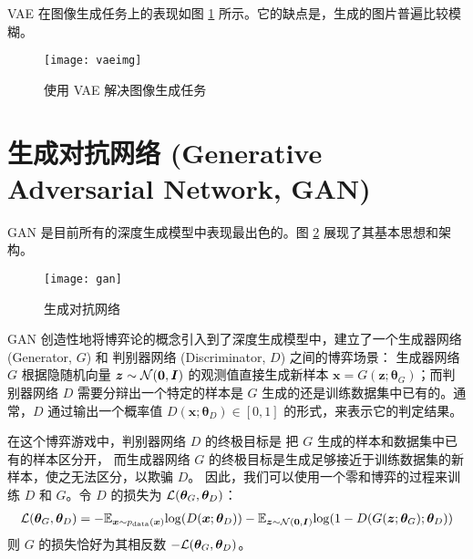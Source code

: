 VAE 在图像生成任务上的表现如图 \ref{fig:vaeimg} 所示。它的缺点是，生成的图片普遍比较模糊。
\begin{figure}[h]
	\centering%
	{\texttt{[image: vaeimg]}}
	\caption{使用 VAE 解决图像生成任务\cite{vae}}\label{fig:vaeimg}
\end{figure}







\section{生成对抗网络 (Generative Adversarial Network, GAN) \label{section:gan}}
GAN\cite{gan} 是目前所有的深度生成模型中表现最出色的。图 \ref{fig:gan} 展现了其基本思想和架构。


\begin{figure}[h]
	\centering%
	{\texttt{[image: gan]}}
	\caption{生成对抗网络}\label{fig:gan}
\end{figure}
GAN 创造性地将博弈论的概念引入到了深度生成模型中，建立了一个生成器网络 (Generator, $G$) 和 判别器网络 (Discriminator, $D$) 之间的博弈场景：
生成器网络 $G$ 根据隐随机向量 $\bm z \sim \mathcal{N}(\bm 0, \bm I)$ 的观测值直接生成新样本 $\bm x = G(\bm z; \bm\theta_G)$；而判别器网络 $D$ 需要分辩出一个特定的样本是 $G$ 生成的还是训练数据集中已有的。通常，$D$ 通过输出一个概率值 $D(\bm x; \bm\theta_D) \in [0, 1]$ 的形式，来表示它的判定结果。

在这个博弈游戏中，判别器网络 $D$ 的终极目标是
把 $G$ 生成的样本和数据集中已有的样本区分开，
而生成器网络 $G$ 的终极目标是生成足够接近于训练数据集的新样本，使之无法区分，以欺骗 $D$。
因此，我们可以使用一个零和博弈的过程来训练 $D$ 和 $G$。令 $D$ 的损失为 $\mathcal{L}(\bm\theta_G, \bm\theta_D)$：%
\begin{align}
	\mathcal{L}(\bm\theta_G, \bm\theta_D) =
	- \mathbb{E}_{\bm x \sim p_{\mathrm {data}}(\bm x)} {\log}(    D(\bm x; \bm\theta_D))
	- \mathbb{E}_{\bm z \sim \mathcal{N}(\bm 0, \bm I)} {\log}(1 - D( G(\bm z; \bm\theta_G); \bm\theta_D))
	\label{eq:ganloss}
\end{align}
则 $G$ 的损失恰好为其相反数 $- \mathcal{L}(\bm\theta_G, \bm\theta_D)$。

